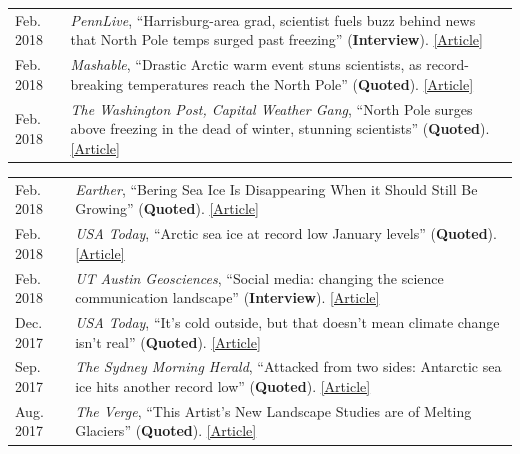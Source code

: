 \documentclass[margin,line,palatino,courier,10pt]{res}
\begin{document}
\begin{resume}
\begin{tabular}{@{}p{0.9in}p{4in}}
Feb. 2018 & \textit{PennLive}, ``Harrisburg-area grad, scientist fuels buzz behind news that North Pole temps surged past freezing'' (\textbf{Interview}). \href{http://www.pennlive.com/news/2018/02/harrisburg-area_scientist_is_b.html}{[Article]}\\
Feb. 2018 & \textit{Mashable}, ``Drastic Arctic warm event stuns scientists, as record-breaking temperatures reach the North Pole'' (\textbf{Quoted}). \href{https://mashable.com/2018/02/26/arctic-heat-wave-north-pole-february-sea-ice/?utm_cid=hp-h-2#jZ.Ip1wPjkqD}{[Article]}\\
Feb. 2018 & \textit{The Washington Post, Capital Weather Gang}, ``North Pole surges above freezing in the dead of winter, stunning scientists'' (\textbf{Quoted}). \href{https://www.washingtonpost.com/news/capital-weather-gang/wp/2018/02/26/north-pole-surges-above-freezing-in-the-dead-of-winter-stunning-scientists/?utm_term=.6025384d6bf1}{[Article]}\\
\end{tabular}
\begin{tabular}{@{}p{0.9in}p{4in}}
Feb. 2018 & \textit{Earther}, ``Bering Sea Ice Is Disappearing When it Should Still Be Growing'' (\textbf{Quoted}). \href{https://earther.com/bering-sea-ice-is-disappearing-at-a-time-when-it-should-1823193914}{[Article]}\\
Feb. 2018 & \textit{USA Today}, ``Arctic sea ice at record low January levels'' (\textbf{Quoted}). \href{https://www.usatoday.com/story/weather/2018/02/20/arctic-sea-ice-record-low-january-levels/355738002/}{[Article]}\\
Feb. 2018 & \textit{UT Austin Geosciences}, ``Social media: changing the science communication landscape'' (\textbf{Interview}). \href{https://www.jsg.utexas.edu/science-yall/social-media-landscape/}{[Article]}\\
Dec. 2017 & \textit{USA Today}, ``It's cold outside, but that doesn't mean climate change isn't real'' (\textbf{Quoted}). \href{https://www.usatoday.com/story/weather/2017/12/28/its-cold-outside-but-doesnt-mean-climate-change-isnt-real/987948001/}{[Article]}\\
Sep. 2017 & \textit{The Sydney Morning Herald}, ``Attacked from two sides: Antarctic sea ice hits another record low'' (\textbf{Quoted}). \href{http://www.smh.com.au/environment/climate-change/attacked-from-two-sides-antarctic-sea-ice-hits-another-record-low-20170926-gyouuc.html}{[Article]}\\
Aug. 2017 & \textit{The Verge}, ``This Artist's New Landscape Studies are of Melting Glaciers'' (\textbf{Quoted}). \href{http://sites.uci.edu/zlabe/media-and-outreach/?preview_id=567&preview_nonce=d7dd77fe7a&_thumbnail_id=-1&preview=true}{[Article]}\\

\end{tabular}
\end{resume}
\end{document}
